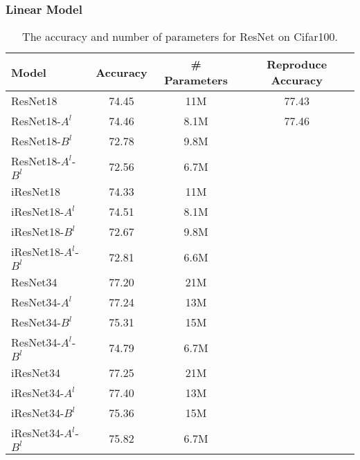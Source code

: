 \subsubsection{Linear Model}

\begin{table}[!h]
	\begin{center}
		\begin{tabular}{|l|cc|c|}
			\hline
			Model   					& Accuracy  & \# Parameters & Reproduce Accuracy \\	
			\hline\hline
			ResNet18       				& 74.45		& 11M  	&   77.43\\ \hline
			ResNet18-$A^l$ 				& 74.46 	& 8.1M 	&   77.46\\ \hline
			ResNet18-$B^l$ 				& 72.78  	& 9.8M 	&\\ \hline
			ResNet18-$A^l$-$B^l$ 		& 72.56  	& 6.7M 	&\\ \hline
			iResNet18       			& 74.33 	& 11M  	&\\ \hline
			iResNet18-$A^l$ 			& 74.51 	& 8.1M  &\\ \hline
			iResNet18-$B^l$ 			& 72.67 	& 9.8M  &\\ \hline
			iResNet18-$A^l$-$B^l$ 		& 72.81  	& 6.6M 	&\\ \hline
			ResNet34       				& 77.20 	& 21M &\\ \hline
			ResNet34-$A^l$ 				& 77.24 	& 13M &\\ \hline
			ResNet34-$B^l$ 				& 75.31		& 15M &\\ \hline
			ResNet34-$A^l$-$B^l$ 		& 74.79   	& 6.7M &\\ \hline
			iResNet34       			& 77.25 	& 21M &\\ \hline
			iResNet34-$A^l$ 			& 77.40 	& 13M   &\\ \hline
			iResNet34-$B^l$ 			& 75.36 	& 15M  &\\ \hline
			iResNet34-$A^l$-$B^l$ 		& 75.82 	& 6.7M  & \\ \hline
		\end{tabular}
	\end{center}
	\caption{The accuracy and number of parameters for ResNet on Cifar100.}
\end{table}

